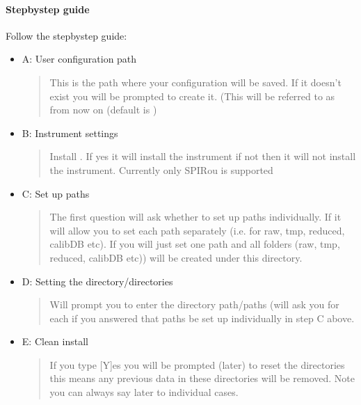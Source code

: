 \documentclass[a4paper,10pt,english]{report}
\begin{document}
\paragraph{Step\sphinxhyphen{}by\sphinxhyphen{}step guide}
\label{\detokenize{user/general/installation:step-by-step-guide}}
Follow the step\sphinxhyphen{}by\sphinxhyphen{}step guide:
\begin{itemize}
\item {} 
A: User configuration path
\begin{quote}

This is the path where your configuration will be saved. If it doesn’t exist you will be prompted to create it.
(This will be referred to as {\hyperref[\detokenize{misc/glossary:term-drs-uconfig}]{}} from now on (default is )
\end{quote}

\item {} 
B: Instrument settings
\begin{quote}

Install {\hyperref[\detokenize{misc/glossary:term-instrument}]{}}.
If yes it will install the instrument if not then it will not install the instrument. Currently only SPIRou is supported
\end{quote}

\item {} 
C: Set up paths
\begin{quote}

The first question will ask  whether to set up paths individually. If 
it will allow you to set each path separately (i.e. for raw, tmp, reduced, calibDB etc). If 
you will just set one path and all folders (raw, tmp, reduced, calibDB etc)) will be created under this directory.
\end{quote}

\item {} 
D: Setting the directory/directories
\begin{quote}

Will prompt you to enter the directory path/paths (will ask you for each if you answered that paths be set up individually in step C above.
\end{quote}

\item {} 
E: Clean install
\begin{quote}

If you type {[}Y{]}es you will be prompted (later) to reset the directories this means any previous data in these directories will be removed. Note you can always say later to individual cases.
\end{quote}

\end{itemize}
\end{document}

